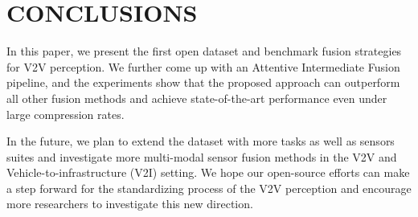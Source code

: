 \documentclass[letterpaper, 10 pt, conference]{ieeeconf}  %
\begin{document}

\section{CONCLUSIONS}
In this paper, we present the first open dataset and benchmark fusion strategies for V2V perception. We further come up with an Attentive Intermediate Fusion pipeline, and the experiments show that the proposed approach can outperform all other fusion methods and achieve state-of-the-art performance even under large compression rates. 

In the future, we plan to extend the dataset with more tasks as well as sensors suites and investigate more multi-modal sensor fusion methods in the V2V and Vehicle-to-infrastructure (V2I) setting. We hope our open-source efforts can make a step forward for the standardizing process of the V2V perception and encourage more researchers to investigate this new direction. 






\addtolength{\textheight}{-3cm}   %












\end{document}
